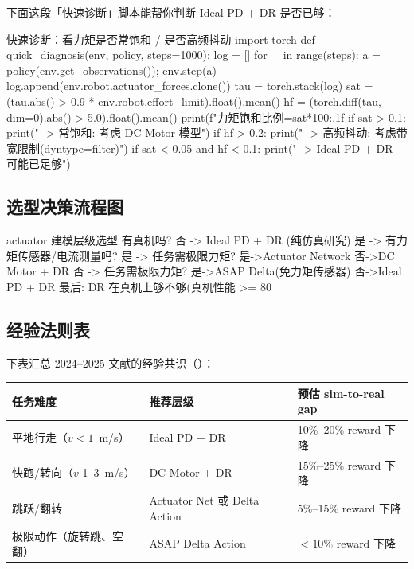 下面这段「快速诊断」脚本能帮你判断 Ideal PD $+$ DR 是否已够：

\begin{codebox}[Python]{快速诊断：看力矩是否常饱和 / 是否高频抖动}
import torch
def quick_diagnosis(env, policy, steps=1000):
    log = []
    for _ in range(steps):
        a = policy(env.get_observations()); env.step(a)
        log.append(env.robot.actuator_forces.clone())
    tau = torch.stack(log)
    sat = (tau.abs() > 0.9 * env.robot.effort_limit).float().mean()
    hf  = (torch.diff(tau, dim=0).abs() > 5.0).float().mean()
    print(f"力矩饱和比例={sat*100:.1f}%
    if sat > 0.1: print("  -> 常饱和: 考虑 DC Motor 模型")
    if hf  > 0.2: print("  -> 高频抖动: 考虑带宽限制(dyntype=filter)")
    if sat < 0.05 and hf < 0.1: print("  -> Ideal PD + DR 可能已足够")
\end{codebox}

\subsection{选型决策流程图}
\label{sec:rlmc-act-decision-flow}

\begin{codebox}{actuator 建模层级选型}
有真机吗?  否 -> Ideal PD + DR (纯仿真研究)
           是 -> 有力矩传感器/电流测量吗?
                 是 -> 任务需极限力矩? 是->Actuator Network  否->DC Motor + DR
                 否 -> 任务需极限力矩? 是->ASAP Delta(免力矩传感器)  否->Ideal PD + DR
最后: DR 在真机上够不够(真机性能 >= 80%
\end{codebox}

\subsection{经验法则表}
\label{sec:rlmc-act-decision-rules}

下表汇总 2024--2025 文献的经验共识（）：

\begin{center}
\small
\begin{tabular}{@{}lll@{}}
\toprule
任务难度 & 推荐层级 & 预估 sim-to-real gap \\
\midrule
平地行走（$v<1$~m/s） & Ideal PD $+$ DR & 10\%--20\% reward 下降 \\
快跑/转向（$v$ 1--3~m/s） & DC Motor $+$ DR & 15\%--25\% reward 下降 \\
跳跃/翻转 & Actuator Net 或 Delta Action & 5\%--15\% reward 下降 \\
极限动作（旋转跳、空翻） & ASAP Delta Action & $<10\%$ reward 下降 \\
\bottomrule
\end{tabular}
\end{center}

